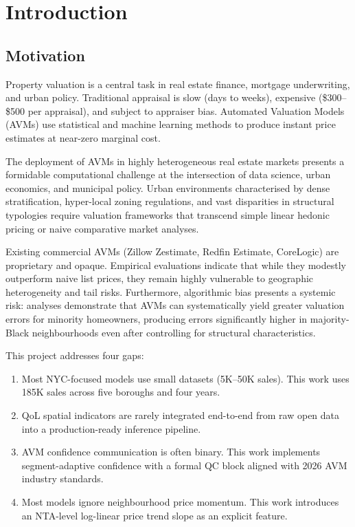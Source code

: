 \documentclass[11pt, a4paper, twoside]{article}
\begin{document}
\tableofcontents
\newpage

\section{Introduction}
\label{sec:intro}

\subsection{Motivation}
Property valuation is a central task in real estate finance, mortgage
underwriting, and urban policy. Traditional appraisal is slow (days to weeks),
expensive (\$300--\$500 per appraisal), and subject to appraiser bias.
Automated Valuation Models (AVMs) use statistical and machine learning methods
to produce instant price estimates at near-zero marginal cost.

The deployment of AVMs in highly heterogeneous real estate markets presents a
formidable computational challenge at the intersection of data science, urban
economics, and municipal policy. Urban environments characterised by dense
stratification, hyper-local zoning regulations, and vast disparities in
structural typologies require valuation frameworks that transcend simple linear
hedonic pricing or naive comparative market analyses.

Existing commercial AVMs (Zillow Zestimate, Redfin Estimate, CoreLogic) are
proprietary and opaque. Empirical evaluations indicate that while they modestly
outperform naive list prices, they remain highly vulnerable to geographic
heterogeneity and tail risks. Furthermore, algorithmic bias presents a systemic
risk: analyses demonstrate that AVMs can systematically yield greater valuation
errors for minority homeowners, producing errors significantly higher in
majority-Black neighbourhoods even after controlling for structural
characteristics.

This project addresses four gaps:
\begin{enumerate}
  \item Most NYC-focused models use small datasets (5K--50K sales). This work
        uses 185K sales across five boroughs and four years.
  \item QoL spatial indicators are rarely integrated end-to-end from raw open
        data into a production-ready inference pipeline.
  \item AVM confidence communication is often binary. This work implements
        segment-adaptive confidence with a formal QC block aligned with 2026
        AVM industry standards.
  \item Most models ignore neighbourhood price momentum. This work introduces
        an NTA-level log-linear price trend slope as an explicit feature.
\end{enumerate}
\end{document}
